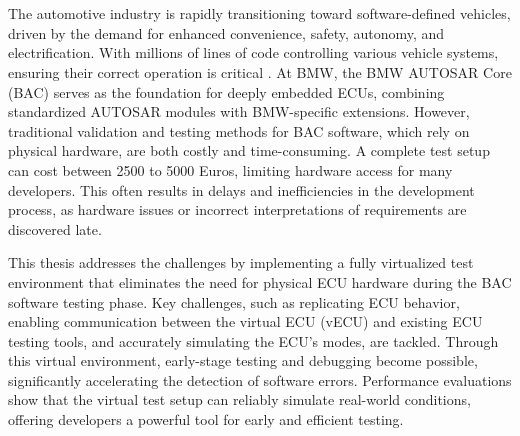 \chapter{\abstractname}

The automotive industry is rapidly transitioning toward software-defined vehicles, driven by the demand for enhanced convenience, safety, autonomy, and electrification. With millions of lines of code controlling various vehicle systems, ensuring their correct operation is critical \cite{synopsys2023software}. At BMW, the BMW AUTOSAR Core (BAC) serves as the foundation for deeply embedded ECUs, combining standardized AUTOSAR modules with BMW-specific extensions. However, traditional validation and testing methods for BAC software, which rely on physical hardware, are both costly and time-consuming. A complete test setup can cost between 2500 to 5000 Euros, limiting hardware access for many developers. This often results in delays and inefficiencies in the development process, as hardware issues or incorrect interpretations of requirements are discovered late.

This thesis addresses the challenges by implementing a fully virtualized test environment that eliminates the need for physical ECU hardware during the BAC software testing phase. Key challenges, such as replicating ECU behavior, enabling communication between the virtual ECU (vECU) and existing ECU testing tools, and accurately simulating the ECU’s modes, are tackled. Through this virtual environment, early-stage testing and debugging become possible, significantly accelerating the detection of software errors. Performance evaluations show that the virtual test setup can reliably simulate real-world conditions, offering developers a powerful tool for early and efficient testing.





\renewcommand{\abstractname}{Abstract}





